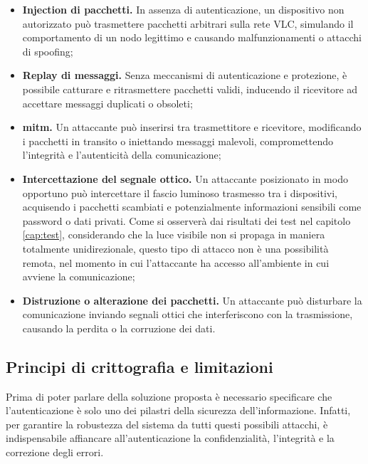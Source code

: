 \begin{itemize}
    \item \textbf{Injection di pacchetti.} In assenza di autenticazione, un dispositivo non autorizzato può trasmettere pacchetti arbitrari sulla rete VLC, simulando il comportamento di un nodo legittimo e causando malfunzionamenti o attacchi di spoofing;
    \item \textbf{Replay di messaggi.} Senza meccanismi di autenticazione e protezione, è possibile catturare e ritrasmettere pacchetti validi, inducendo il ricevitore ad accettare messaggi duplicati o obsoleti;
    \item \textbf{\gls{mitm}\glsfirstoccur.} Un attaccante può inserirsi tra trasmettitore e ricevitore, modificando i pacchetti in transito o iniettando messaggi malevoli, compromettendo l'integrità e l'autenticità della comunicazione;
    \item \textbf{Intercettazione del segnale ottico.} Un attaccante posizionato in modo opportuno può intercettare il fascio luminoso trasmesso tra i dispositivi, acquisendo i pacchetti scambiati e potenzialmente informazioni sensibili come password o dati privati. Come si osserverà dai risultati dei test nel capitolo \ref{cap:test}, considerando che la luce visibile non si propaga in maniera totalmente unidirezionale, questo tipo di attacco non è una possibilità remota, nel momento in cui l'attaccante ha accesso all'ambiente in cui avviene la comunicazione;
    \item \textbf{Distruzione o alterazione dei pacchetti.} Un attaccante può disturbare la comunicazione inviando segnali ottici che interferiscono con la trasmissione, causando la perdita o la corruzione dei dati.
\end{itemize}

\subsection{Principi di crittografia e limitazioni}
Prima di poter parlare della soluzione proposta è necessario specificare che l'autenticazione è solo uno dei pilastri della sicurezza dell'informazione. Infatti, per garantire la robustezza del sistema da tutti questi possibili attacchi, è indispensabile affiancare all'autenticazione la confidenzialità, l'integrità e la correzione degli errori.

